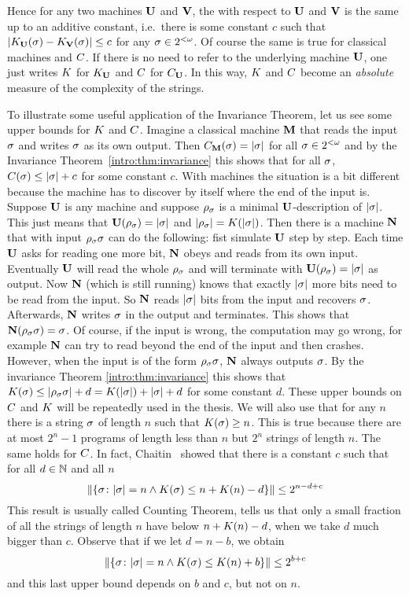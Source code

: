 Hence for any two \pfree \opt machines ${\bf U}$ and ${\bf V}$, the \pfree
\kolcomp with respect to ${\bf U}$ and ${\bf V}$ is the same up to an
additive constant, i.e.\ there is some constant $c$ such that
$\left| K_{{\bf U}}(\sigma)-K_{{\bf V}}(\sigma) \right|\leq c$ for any $\sigma\in2^{<\omega}$. Of
course the same is true for classical machines and $\C$. If there
is no need to refer to the underlying \opt machine ${\bf U}$, one just
writes \glossary{$\K$}$\K$ for $K_{{\bf U}}$ and \glossary{$\C$}$\C$ for
$C_{{\bf U}}$. In this way, $\K$ and $\C$ become an {\em absolute} measure
of the complexity of the strings.

To illustrate some useful application of the Invariance Theorem,
let us see some upper bounds for $\K$ and $\C$. Imagine a
classical machine ${\bf M}$ that reads the input $\sigma$ and writes
$\sigma$ as its own output. Then $C_{{\bf M}}(\sigma)=| \sigma |$ for all
$\sigma\in2^{<\omega}$ and by the Invariance
Theorem~\ref{intro:thm:invariance} this shows that for all $\sigma$,
$C(\sigma)\leq | \sigma |+c$ for some constant $c$. With \pfree
machines the situation is a bit different because the machine has
to discover by itself where the end of the input is. Suppose ${\bf U}$
is any \opt \pfree machine and suppose $\rho_\sigma$ is a minimal
${\bf U}$-description of $| \sigma |$. This just means that
${\bf U}(\rho_\sigma)=| \sigma |$ and $| \rho_\sigma |=K(| \sigma |)$.
Then there is a \pfree machine ${\bf N}$ that with input
$\rho_\sigma\sigma$ can do the following: fist simulate ${\bf U}$ step by
step. Each time ${\bf U}$ asks for reading one more bit, ${\bf N}$ obeys and
reads from its own input. Eventually ${\bf U}$ will read the whole
$\rho_\sigma$ and will terminate with ${\bf U}(\rho_\sigma)=| \sigma |$ as
output. Now ${\bf N}$ (which is still running) knows that exactly
$| \sigma |$ more bits need to be read from the input. So ${\bf N}$
reads $| \sigma |$ bits from the input and recovers $\sigma$.
Afterwards, ${\bf N}$ writes $\sigma$ in the output and terminates. This
shows that ${\bf N}(\rho_\sigma\sigma)=\sigma$. Of course, if the input is
wrong, the computation may go wrong, for example ${\bf N}$ can try to
read beyond the end of the input and then crashes. However, when
the input is of the form $\rho_\sigma\sigma$, ${\bf N}$ always outputs
$\sigma$. By the invariance Theorem \ref{intro:thm:invariance} this
shows that $K(\sigma)\leq | \rho_\sigma\sigma | + d =
K(| \sigma |)+| \sigma |+d$ for some constant $d$. These upper
bounds on $\C$ and $\K$ will be repeatedly used in the thesis. We
will also use that for any $n$ there is a string $\sigma$ of length
$n$ such that $K(\sigma)\geq n$. This is true because there are at
most $2^n-1$ programs of length less than $n$ but $2^n$ strings of
length $n$. The same holds for $\C$. In fact,
Chaitin~\cite{chaitin1975theory,C87b} showed that there is a constant $c$ such
that for all $d\in\mathbb{N}$ and all $n$
$$
\| \{ \sigma \colon | \sigma |=n \wedge K(\sigma)\leq n + K(n)-d
\} \| \leq 2^{n-d+c}
$$
This result is usually called Counting
Theorem, tells us that only a small fraction of all the strings of
length $n$ have \pfree \kolcomp below $n+K(n)-d$, when we take
$d$ much bigger than $c$.
Observe that if we let $d=n-b$, we obtain
$$
\| \{ \sigma \colon | \sigma |=n \wedge K(\sigma)\leq K(n)+b
\} \| \leq 2^{b+c}
$$
and this last upper bound depends on $b$ and $c$, but not on $n$.


